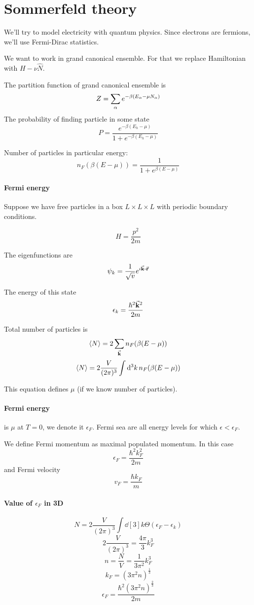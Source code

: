 \section{Sommerfeld theory}
We'll try to model electricity with quantum physics. Since electrons are fermions, we'll use Fermi-Dirac statistics.

We want to work in grand canonical ensemble. For that we replace Hamiltonian with $H-\nu \hat{N}$.

The partition function of grand canonical ensemble is
$$Z = \sum_{\alpha} e^{-\beta \qty(E_\alpha - \mu N_\alpha)}$$
The probability of finding particle in some state
$$P = \frac{e^{-\beta(E_h-\mu)}}{1+e^{-\beta(E_h-\mu)}}$$

Number of particles in particular energy:
$$n_F(\beta(E-\mu)) = \frac{1}{1+e^{\beta(E-\mu)}}$$


\paragraph{Fermi energy}
Suppose we have free particles in a box $L\times L \times L$ with periodic boundary conditions.


$$H= \frac{p^2}{2m}$$

The eigenfunctions are 
$$\psi_k = \frac{1}{\sqrt{v}}e^{i\va{k} \vdot \va{r}}$$

The energy of this state
$$\epsilon_k  = \frac{\hbar^2 \va{k}^2}{2m}$$

Total number of particles is
$$\expval{N} = 2\sum_{\va{k}} n_F(\beta(E-\mu)) $$
$$\expval{N} = 2\frac{V}{(2\pi)^3}\int \dd[3]{k} n_F(\beta(E-\mu)) $$

This equation defines $\mu$ (if we know number of particles).

\paragraph{Fermi energy} is $\mu$ at $T=0$, we denote it $\epsilon_F$. Fermi sea are all energy levels for which $\epsilon<\epsilon_F$.

We define Fermi momentum as maximal populated momentum. In this case
$$\epsilon_F = \frac{\hbar^2 k_F^2}{2m}$$
and Fermi velocity
$$v_F = \frac{\hbar k_F}{m}$$

\paragraph{Value of $\epsilon_F$ in 3D}
$$N = 2 \frac{V}{(2\pi)^3}\int \dd[3]{k} \Theta(\epsilon_F-\epsilon_k)$$
$$ 2 \frac{V}{(2\pi)^3} =\frac{4\pi}{3} k_F^3$$
$$n=\frac{N}{V} = \frac{1}{3\pi^2}k_F^3$$
$$k_F = (3\pi^2 n)^{\frac{1}{3}}$$
$$\epsilon_F = \frac{\hbar^2(3\pi^2 n)^{\frac{2}{3}}}{2m}$$



